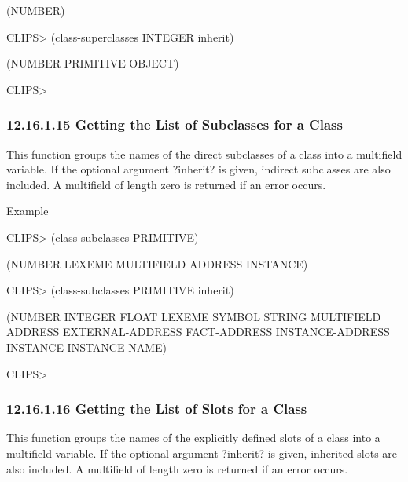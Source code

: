 \documentclass[letterpaper,10pt,english]{sphinxmanual}
\begin{document}
(NUMBER)

CLIPS\textgreater{} (class-superclasses INTEGER inherit)

(NUMBER PRIMITIVE OBJECT)

CLIPS\textgreater{}


\subsubsection{12.16.1.15 Getting the List of Subclasses for a Class}
\label{\detokenize{actions:getting-the-list-of-subclasses-for-a-class}}
This function groups the names of the direct subclasses of a class into
a multifield variable. If the optional argument ?inherit? is given,
indirect subclasses are also included. A multifield of length zero is
returned if an error occurs.


\begin{sphinxVerbatim}[commandchars=\\\{\}]
  \PYG{p}{[}\PYG{p}{]}
\end{sphinxVerbatim}

Example

CLIPS\textgreater{} (class-subclasses PRIMITIVE)

(NUMBER LEXEME MULTIFIELD ADDRESS INSTANCE)

CLIPS\textgreater{} (class-subclasses PRIMITIVE inherit)

(NUMBER INTEGER FLOAT LEXEME SYMBOL STRING MULTIFIELD ADDRESS
EXTERNAL-ADDRESS FACT-ADDRESS INSTANCE-ADDRESS INSTANCE INSTANCE-NAME)

CLIPS\textgreater{}


\subsubsection{12.16.1.16 Getting the List of Slots for a Class}
\label{\detokenize{actions:getting-the-list-of-slots-for-a-class}}
This function groups the names of the explicitly defined slots of a
class into a multifield variable. If the optional argument ?inherit? is
given, inherited slots are also included. A multifield of length zero is
returned if an error occurs.


\begin{sphinxVerbatim}[commandchars=\\\{\}]
  \PYG{p}{[}\PYG{p}{]}
\end{sphinxVerbatim}
\end{document}
